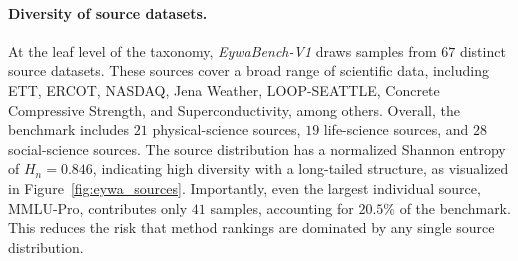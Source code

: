 \begin{table}[h]
\centering
\caption{Detailed composition of \textit{EywaBench-V1} by parent domain, sub-domain, modality, and source dataset. 
For each sub-domain, we report the total number of samples, the number of natural-language, time-series, and tabular samples, and the number of distinct source datasets. 
The total number of unique source datasets is $67$, which is smaller than the sum of per-sub-domain source counts because each source dataset may contribute multiple samples.}
\label{tab:eywa_subdomain}
\end{table}


\paragraph{Diversity of source datasets.}
At the leaf level of the taxonomy, \textit{EywaBench-V1} draws samples from $67$ distinct source datasets. These sources cover a broad range of scientific data, including ETT, ERCOT, NASDAQ, Jena Weather, LOOP-SEATTLE, Concrete Compressive Strength, and Superconductivity, among others. Overall, the benchmark includes $21$ physical-science sources, $19$ life-science sources, and $28$ social-science sources. The source distribution has a normalized Shannon entropy of $H_n{=}0.846$, indicating high diversity with a long-tailed structure, as visualized in Figure~\ref{fig:eywa_sources}. Importantly, even the largest individual source, MMLU-Pro, contributes only $41$ samples, accounting for $20.5\%$ of the benchmark. This reduces the risk that method rankings are dominated by any single source distribution.


